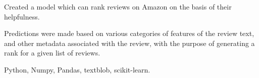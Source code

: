 \begin{tightemize}
\item Created a model which can rank reviews on Amazon on the basis of their helpfulness.
\item Predictions were made based on various categories of features of the review text, and other metadata associated with the review, with the purpose of generating a rank for a given list of reviews.
\item {} Python, Numpy, Pandas, textblob, scikit-learn.
\end{tightemize}
\sectionsep

